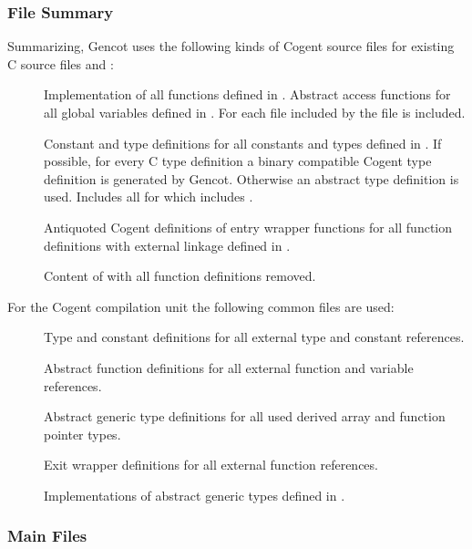 \subsubsection{File Summary}

Summarizing, Gencot uses the following kinds of Cogent source files for existing C source files  and :
\begin{description}
\item[] Implementation of all functions defined in .
  Abstract access functions for all global variables defined in . For each file  included by
   the file  is included.
\item[] Constant and type definitions for all constants and types defined in . 
  If possible, for every C type definition a binary compatible Cogent type 
  definition is generated by Gencot. Otherwise an abstract type definition is used. Includes
  all  for which  includes .
\item[] Antiquoted Cogent definitions of entry wrapper functions for all function definitions with external linkage
  defined in .
\item[] Content of  with all function definitions removed.
\end{description}

For the Cogent compilation unit the following common files are used:
\begin{description}
\item[] Type and constant definitions for all external type and constant references.
\item[] Abstract function definitions for all external function and variable references.
\item[] Abstract generic type definitions for all used derived array and function pointer types.
\item[] Exit wrapper definitions for all external function references.
\item[] Implementations of abstract generic types defined in .
\end{description}

\subsubsection{Main Files}

